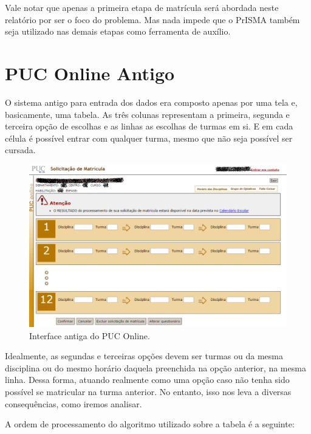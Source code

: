 \documentclass[graduacao,brazil]{ThesisPUC}
\begin{document}
Vale notar que apenas a primeira etapa de matrícula será abordada neste relatório por ser o foco do problema. Mas nada impede que o PrISMA também seja utilizado nas demais etapas como ferramenta de auxílio.

\section{PUC Online Antigo}

O sistema antigo para entrada dos dados era composto apenas por uma tela e, basicamente, uma tabela. As três colunas representam a primeira, segunda e terceira opção de escolhas e as linhas as escolhas de turmas em si. E em cada célula é possível entrar com qualquer turma, mesmo que não seja possível ser cursada.

\begin{figure}[H]
    \centering
    \includegraphics[width=\linewidth]{img/puc_online_antigo.png}
    \caption{Interface antiga do PUC Online.}
\end{figure}

Idealmente, as segundas e terceiras opções devem ser turmas ou da mesma disciplina ou do mesmo horário daquela preenchida na opção anterior, na mesma linha. Dessa forma, atuando realmente como uma opção caso não tenha sido possível se matricular na turma anterior. No entanto, isso nos leva a diversas consequências, como iremos analisar.

A ordem de processamento do algoritmo utilizado sobre a tabela é a seguinte:
\end{document}
